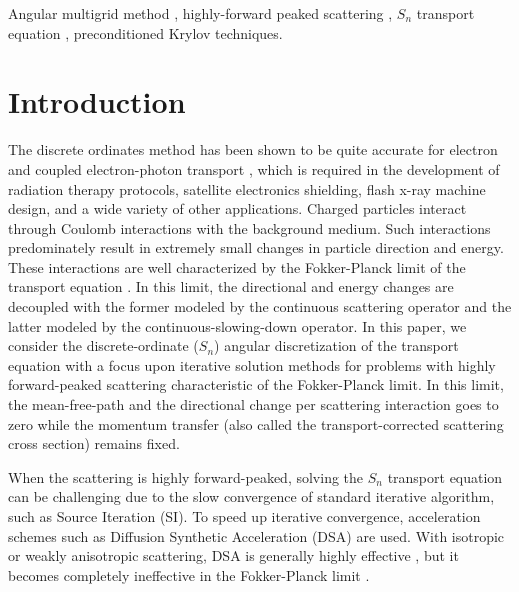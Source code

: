 \documentclass[preprint,10pt]{elsarticle}
\renewcommand{\(}{\left(}
\renewcommand{\)}{\right)}
\renewcommand{\[}{\left[}
\renewcommand{\]}{\right]}
\begin{document}
\begin{frontmatter}
\begin{keyword}
Angular multigrid method \sep
highly-forward peaked scattering \sep
$S_n$ transport equation \sep
preconditioned Krylov techniques.
\end{keyword}
\end{frontmatter}

\doublespacing

\section{Introduction}
The discrete ordinates method has been shown to be quite accurate for electron
and coupled electron-photon transport \cite{morel_81,accuracy_1,accuracy_2}, 
which is required in the
development of radiation therapy protocols, satellite electronics shielding,
flash x-ray machine design, and a wide variety of other applications. Charged
particles interact through Coulomb interactions with the background medium.
Such interactions predominately result in extremely small changes in particle
direction and energy. These interactions are well characterized by the
Fokker-Planck limit of the transport equation \cite{fp_limit,morel_96}. In this limit,
the directional and energy changes are decoupled with the former modeled by the
continuous scattering operator and the latter modeled by the
continuous-slowing-down operator. In this paper, we consider the
discrete-ordinate ($S_n$) angular discretization of the transport equation
with a focus upon iterative solution methods for problems with highly
forward-peaked scattering characteristic of the Fokker-Planck limit. In this
limit, the mean-free-path and the directional change per scattering
interaction goes to zero while the momentum transfer (also called the
transport-corrected scattering cross section) remains fixed.

When the scattering is highly forward-peaked, solving the $S_n$ transport
equation can be challenging due to the slow convergence of standard iterative
algorithm, such as Source Iteration (SI). To speed up iterative convergence,
acceleration schemes such as Diffusion Synthetic Acceleration (DSA) are used.
With isotropic or weakly anisotropic scattering, DSA is generally highly
effective \cite{adams}, but it becomes completely ineffective in the
Fokker-Planck limit \cite{multigrid_1d}.
\end{document}
